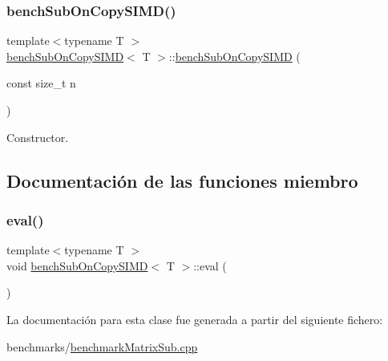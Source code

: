 \subsubsection{\texorpdfstring{bench\+Sub\+On\+Copy\+S\+I\+M\+D()}{benchSubOnCopySIMD()}}
{\footnotesize\ttfamily template$<$typename T $>$ \\
\hyperlink{classbenchSubOnCopySIMD}{bench\+Sub\+On\+Copy\+S\+I\+MD}$<$ T $>$\+::\hyperlink{classbenchSubOnCopySIMD}{bench\+Sub\+On\+Copy\+S\+I\+MD} (\begin{DoxyParamCaption}\item[{const size\+\_\+t}]{n }\end{DoxyParamCaption})\hspace{0.3cm}{\ttfamily [inline]}}



Constructor. 



\subsection{Documentación de las funciones miembro}
\mbox{\label{classbenchSubOnCopySIMD_ac0e553f6d6810a87cd5796750ba1ea83}} 
\subsubsection{\texorpdfstring{eval()}{eval()}}
{\footnotesize\ttfamily template$<$typename T $>$ \\
void \hyperlink{classbenchSubOnCopySIMD}{bench\+Sub\+On\+Copy\+S\+I\+MD}$<$ T $>$\+::eval (\begin{DoxyParamCaption}{ }\end{DoxyParamCaption})\hspace{0.3cm}{\ttfamily [inline]}}



La documentación para esta clase fue generada a partir del siguiente fichero\+:\begin{DoxyCompactItemize}
\item 
benchmarks/\hyperlink{benchmarkMatrixSub_8cpp}{benchmark\+Matrix\+Sub.\+cpp}\end{DoxyCompactItemize}
